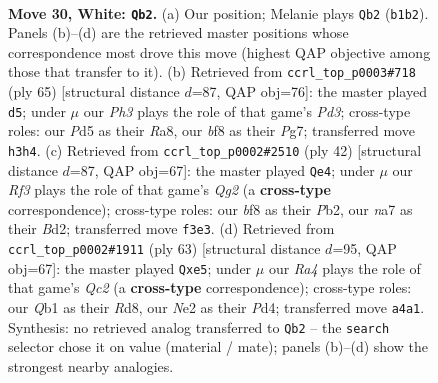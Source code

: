 \documentclass[11pt]{article}
\begin{document}
\clearpage

\begin{figure}[p]\centering
\begin{subfigure}{0.46\textwidth}\centering
\resizebox{\linewidth}{!}{%
\newchessgame
\chessboard[
  setfen={1r3b2/n3rk2/p2p1pp1/3P3p/Rpq1P3/5R1P/3BNPP1/1Q3K2 w - - 2 30},
  showmover=false,
  pgfstyle=straightmove, color=movearrow, markmove={b1-b2}
]}
\caption{}
\end{subfigure}\hfill
\begin{subfigure}{0.46\textwidth}\centering
\resizebox{\linewidth}{!}{%
\newchessgame
\chessboard[
  setfen={r5k1/1p4p1/2pp1r1p/4p2q/PR2P3/2P1NPBb/P4K2/R6Q b - - 5 33},
  showmover=false,
  pgfstyle=straightmove, color=movearrow, markmove={d6-d5}
]}
\caption{}
\end{subfigure}
\\[4pt]
\begin{subfigure}{0.46\textwidth}\centering
\resizebox{\linewidth}{!}{%
\newchessgame
\chessboard[
  setfen={2kr1n1r/pp3p2/2p4p/6pR/2qP2P1/4P3/PP1B1PQ1/R3K3 w Q - 0 22},
  showmover=false,
  pgfstyle=straightmove, color=movearrow, markmove={g2-e4}
]}
\caption{}
\end{subfigure}\hfill
\begin{subfigure}{0.46\textwidth}\centering
\resizebox{\linewidth}{!}{%
\newchessgame
\chessboard[
  setfen={3r2k1/prq2p2/4p2p/2P1Pnp1/1P1p4/3Q4/R2B1PPP/1R4K1 b - - 5 32},
  showmover=false,
  pgfstyle=straightmove, color=movearrow, markmove={c7-e5}
]}
\caption{}
\end{subfigure}
\caption{\textbf{Move 30, White: \texttt{Qb2}.} (a) Our position; Melanie plays \texttt{Qb2} (\texttt{b1b2}). Panels (b)--(d) are the retrieved master positions whose correspondence most drove this move (highest QAP objective among those that transfer to it). (b) Retrieved from \texttt{ccrl\_top\_p0003\#718} (ply 65) [structural distance $d$=87, QAP obj=76]: the master played \texttt{d5}; under $\mu$ our \emph{Ph3} plays the role of that game's \emph{Pd3}; cross-type roles: our \emph{P}d5 as their \emph{R}a8, our \emph{b}f8 as their \emph{P}g7; transferred move \texttt{h3h4}. (c) Retrieved from \texttt{ccrl\_top\_p0002\#2510} (ply 42) [structural distance $d$=87, QAP obj=67]: the master played \texttt{Qe4}; under $\mu$ our \emph{Rf3} plays the role of that game's \emph{Qg2} (a \textbf{cross-type} correspondence); cross-type roles: our \emph{b}f8 as their \emph{P}b2, our \emph{n}a7 as their \emph{B}d2; transferred move \texttt{f3e3}. (d) Retrieved from \texttt{ccrl\_top\_p0002\#1911} (ply 63) [structural distance $d$=95, QAP obj=67]: the master played \texttt{Qxe5}; under $\mu$ our \emph{Ra4} plays the role of that game's \emph{Qc2} (a \textbf{cross-type} correspondence); cross-type roles: our \emph{Q}b1 as their \emph{R}d8, our \emph{N}e2 as their \emph{P}d4; transferred move \texttt{a4a1}. Synthesis: no retrieved analog transferred to \texttt{Qb2} -- the \texttt{search} selector chose it on value (material / mate); panels (b)--(d) show the strongest nearby analogies.}
\label{fig:thought-m58}
\end{figure}
\end{document}
